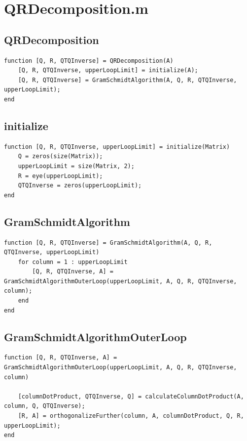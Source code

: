 \section{QRDecomposition.m}
\subsection{QRDecomposition}
\begin{simplechar}
\begin{lstlisting}
function [Q, R, QTQInverse] = QRDecomposition(A)
    [Q, R, QTQInverse, upperLoopLimit] = initialize(A);
    [Q, R, QTQInverse] = GramSchmidtAlgorithm(A, Q, R, QTQInverse, upperLoopLimit);
end
\end{lstlisting}
\end{simplechar}

\subsection{initialize}
\begin{simplechar}
\begin{lstlisting}
function [Q, R, QTQInverse, upperLoopLimit] = initialize(Matrix)
    Q = zeros(size(Matrix));
    upperLoopLimit = size(Matrix, 2);
    R = eye(upperLoopLimit);
    QTQInverse = zeros(upperLoopLimit);
end
\end{lstlisting}
\end{simplechar}

\subsection{GramSchmidtAlgorithm}
\begin{simplechar}
\begin{lstlisting}
function [Q, R, QTQInverse] = GramSchmidtAlgorithm(A, Q, R, QTQInverse, upperLoopLimit)
    for column = 1 : upperLoopLimit
        [Q, R, QTQInverse, A] = GramSchmidtAlgorithmOuterLoop(upperLoopLimit, A, Q, R, QTQInverse, column);
    end
end
\end{lstlisting}
\end{simplechar}

\subsection{GramSchmidtAlgorithmOuterLoop}
\begin{simplechar}
\begin{lstlisting}
function [Q, R, QTQInverse, A] = GramSchmidtAlgorithmOuterLoop(upperLoopLimit, A, Q, R, QTQInverse, column)

    [columnDotProduct, QTQInverse, Q] = calculateColumnDotProduct(A, column, Q, QTQInverse);
    [R, A] = orthogonalizeFurther(column, A, columnDotProduct, Q, R, upperLoopLimit);
end
\end{lstlisting}
\end{simplechar}

